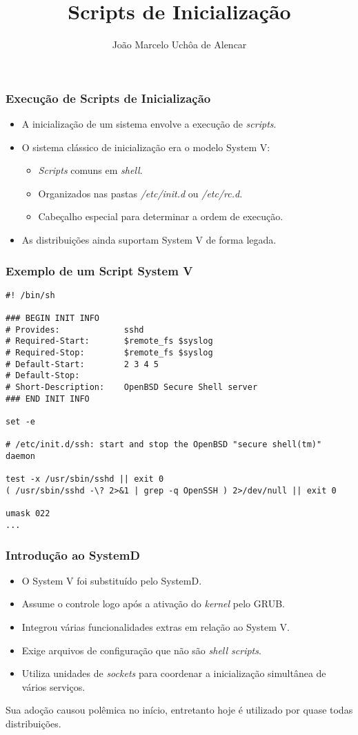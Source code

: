 \documentclass{beamer}
\title{Scripts de Inicialização}
\author[João Marcelo Uchôa de Alencar]{João Marcelo Uchôa de Alencar}
\institute{Universidade Federal do Ceará - Quixadá}
\begin{document}
   \begin{frame}
      \titlepage
   \end{frame}

   \begin{frame}
      \frametitle{Execução de Scripts de Inicialização}
      \begin{itemize}
          \item A inicialização de um sistema envolve a execução de \textit{scripts}.
          \item O sistema clássico de inicialização era o modelo System V:
	  \begin{itemize}
	     \item \textit{Scripts} comuns em \textit{shell}.
	     \item Organizados nas pastas \textit{/etc/init.d} ou \textit{/etc/rc.d}.
	     \item Cabeçalho especial para determinar a ordem de execução.
          \end{itemize}
          \item As distribuições ainda suportam System V de forma legada.  
      \end{itemize}
   \end{frame}

   \begin{frame}[fragile]
      \frametitle{Exemplo de um Script System V}
      \begin{verbatim}
#! /bin/sh

### BEGIN INIT INFO
# Provides:             sshd
# Required-Start:       $remote_fs $syslog
# Required-Stop:        $remote_fs $syslog
# Default-Start:        2 3 4 5
# Default-Stop:
# Short-Description:    OpenBSD Secure Shell server
### END INIT INFO

set -e

# /etc/init.d/ssh: start and stop the OpenBSD "secure shell(tm)" daemon

test -x /usr/sbin/sshd || exit 0
( /usr/sbin/sshd -\? 2>&1 | grep -q OpenSSH ) 2>/dev/null || exit 0

umask 022
...
      \end{verbatim}
\end{frame}

   \begin{frame}
      \frametitle{Introdução ao SystemD}
      \begin{itemize}
         \item O System V foi substituído pelo SystemD.
	 \item Assume o controle logo após a ativação do \textit{kernel} pelo GRUB.
         \item Integrou várias funcionalidades extras em relação ao System V.
	 \item Exige arquivos de configuração que não são \textit{shell scripts}.
         \item Utiliza unidades de \textit{sockets} para coordenar a inicialização simultânea de vários serviços.
      \end{itemize}
      Sua adoção causou polêmica no início, entretanto hoje é utilizado por quase todas distribuições.
   \end{frame}
\end{document}
